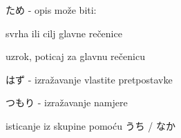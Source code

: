 
\author{Tomislav Mamić}

	
	
	\begin{hyou}
		\item ため - opis može biti:
		\begin{hyou}
			\item svrha ili cilj glavne rečenice
			\item uzrok, poticaj za glavnu rečenicu
		\end{hyou}
		\item はず - izražavanje vlastite pretpostavke
		\item つもり - izražavanje namjere
		\item isticanje iz skupine pomoću うち / なか
	\end{hyou}
